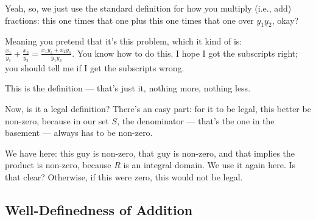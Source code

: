 \begin{speech}[00:58:43 - 01:00:01]
Yeah, so, we just use the standard definition for how you multiply (i.e., add) fractions: this one times that one plus this one times that one over $y_1 y_2$, okay? 

Meaning you pretend that it's this problem, which it kind of is:  $\frac{x_1}{y_1} + \frac{x_2}{y_2} = \frac{x_1 y_2 + x_2 y_1}{y_1 y_2}$. You know how to do this. I hope I got the subscripts right; you should tell me if I get the subscripts wrong.

This is the definition --- that's just it, nothing more, nothing less.

Now, is it a legal definition? There's an easy part: for it to be legal, this better be non-zero,  because in our set $S$, the denominator --- that's the one in the basement --- always has to be non-zero.

We have here: this guy is non-zero, that guy is non-zero, and that implies the product is non-zero, because $R$ is an integral domain.  We use it again here. Is that clear? Otherwise, if this were zero, this would not be legal.
\end{speech}

\subsection{Well-Definedness of Addition}

